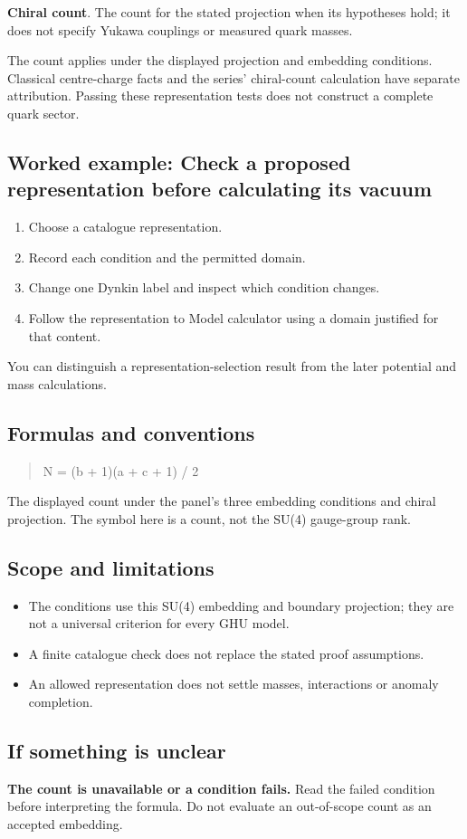 \documentclass[11pt,a4paper]{article}
\begin{document}
\textbf{Chiral count}. The count for the stated projection when its hypotheses hold; it does not specify Yukawa couplings or measured quark masses.

The count applies under the displayed projection and embedding conditions. Classical centre-charge facts and the series' chiral-count calculation have separate attribution. Passing these representation tests does not construct a complete quark sector.
\subsection*{Worked example: Check a proposed representation before calculating its vacuum}
\begin{enumerate}
\item Choose a catalogue representation.
\item Record each condition and the permitted domain.
\item Change one Dynkin label and inspect which condition changes.
\item Follow the representation to Model calculator using a domain justified for that content.
\end{enumerate}
You can distinguish a representation-selection result from the later potential and mass calculations.
\subsection*{Formulas and conventions}
\begin{quote}N = (b + 1)(a + c + 1) / 2\end{quote}
The displayed count under the panel's three embedding conditions and chiral projection. The symbol here is a count, not the SU(4) gauge-group rank.

\subsection*{Scope and limitations}
\begin{itemize}
\item The conditions use this SU(4) embedding and boundary projection; they are not a universal criterion for every GHU model.
\item A finite catalogue check does not replace the stated proof assumptions.
\item An allowed representation does not settle masses, interactions or anomaly completion.
\end{itemize}
\subsection*{If something is unclear}
\textbf{The count is unavailable or a condition fails.} Read the failed condition before interpreting the formula. Do not evaluate an out-of-scope count as an accepted embedding.
\end{document}
